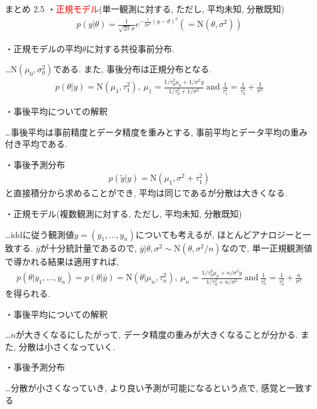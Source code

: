 \documentclass[10pt,dvipdfmx,a4]{beamer}
\newcommand{\eqn}[1]{\begin{align*}#1\end{align*}}
\newcommand{\tcr}[1]{\textcolor{red}{#1}}
\begin{document}
\begin{frame}[t]{まとめ 2.5}
・\tcr{正規モデル}(単一観測に対する, ただし, 平均未知, 分散既知)
\eqn{p(y|\theta)=\frac{1}{\sqrt{2\pi}\sigma}e^{-\frac{1}{2\sigma^2}(y-\theta)^2}(=\text{N}(\theta,\sigma^2))}

・正規モデルの平均$\theta$に対する共役事前分布.

…N$(\mu_0,\sigma_0^2)$である.
また, 事後分布は正規分布となる.
\eqn{p(\theta|y)=\text{N}(\mu_1,\tau^2_1),\ \mu_1=\tfrac{1/\tau_0^2 \mu_0+1/\sigma^2 y}{1/\tau_0^2+1/\sigma^2}\ \text{and}\  \tfrac{1}{\tau_1^2}=\tfrac{1}{\tau_0^2}+\tfrac{1}{\sigma^2}}

・事後平均についての解釈

…事後平均は事前精度とデータ精度を重みとする, 事前平均とデータ平均の重み付き平均である.

・事後予測分布
\eqn{p(\tilde{y}|y)=\text{N}(\mu_1,\sigma^2+\tau^2_1)}
と直接積分から求めることができ, 平均は同じであるが分散は大きくなる.
\end{frame}


\begin{frame}[t]
・正規モデル(複数観測に対する, ただし, 平均未知, 分散既知)

…iddに従う観測値$y=(y_1,\dots,y_n)$についても考えるが, ほとんどアナロジーと一致する.
$\bar{y}$が十分統計量であるので, $\bar{y}|\theta, \sigma^2 \sim \text{N}(\theta,\sigma^2/n)$なので, 単一正規観測値で導かれる結果は適用すれば, 
\eqn{p(\theta|y_1,\dots,y_n)=p(\theta|\bar{y})=\text{N}(\theta|\mu_n,\tau_n^2),\ \mu_n=\tfrac{1/\tau_0^2 \mu_0+n/\sigma^2 y}{1/\tau_0^2+n/\sigma^2}\ \text{and}\  \tfrac{1}{\tau_n^2}=\tfrac{1}{\tau_0^2}+\tfrac{n}{\sigma^2}}
を得られる.

・事後平均についての解釈

…$n$が大きくなるにしたがって, データ精度の重みが大きくなることが分かる.
また, 分散は小さくなっていく.

・事後予測分布

…分散が小さくなっていき, より良い予測が可能になるという点で, 感覚と一致する
\end{frame}

\end{document}
